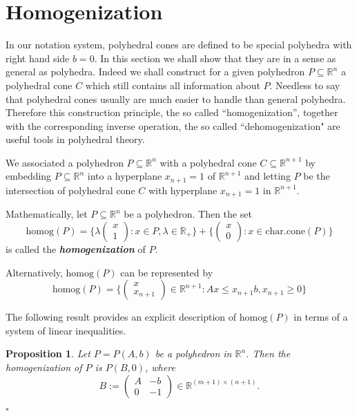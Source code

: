\documentclass{article}
\newtheorem{proposition}[theorem]{Proposition}
\newenvironment{proof}{{\it Proof.}}{ \hfill $\square$}
\def\R{{\mathbb R}}
\begin{document}
\section{Homogenization}
In our notation system,  polyhedral cones are defined to be special polyhedra with right hand side $b=0$. In this section we shall show that they are in a sense as general as polyhedra. Indeed we shall construct for a given polyhedron $P\subseteq \R^n$ a polyhedral cone $C$ which still contains all information about $P$. Needless to say that polyhedral cones usually are much easier to handle than general polyhedra. Therefore this construction principle, the so called ``homogenization'', together with the corresponding inverse operation, the so called ``dehomogenization" are useful tools in polyhedral theory.

We associated a polyhedron $P\subseteq \R^n$ with a polyhedral cone $C\subseteq\R^{n+1}$ by embedding $P\subseteq\R^n$ into a hyperplane $x_{n+1}=1$ of $\R^{n+1}$ and letting $P$ be the intersection of polyhedral cone $C$ with hyperplane $x_{n+1}=1$ in $\R^{n+1}$.

Mathematically, let $P\subseteq \R^n$ be a polyhedron. Then the set
\begin{equation}
\mbox{homog}(P)=\{\lambda\begin{pmatrix}x\\1\end{pmatrix}: x\in P, \lambda\in \R_+\}+\{\begin{pmatrix}x\\0\end{pmatrix}:x\in\mbox{char.cone}(P)\}
\end{equation}
is called the \emph{\textbf{homogenization}} of $P$.

Alternatively, $\mbox{homog}(P)$ can be represented by
\begin{equation}
\mbox{homog}(P)=\{\begin{pmatrix}x\\x_{n+1}\end{pmatrix}\in\R^{n+1}:Ax\leq x_{n+1}b,x_{n+1}\geqslant 0\}
\end{equation}

The following result provides an explicit description of $\mbox{homog}(P)$ in terms of a system of linear inequalities.

\begin{proposition}
Let $P=P(A,b)$ be a polyhedron in $\R^n$. Then the homogenization of $P$ is $P(B,0)$, where
\begin{equation}
B:=\begin{pmatrix}A & -b \\ 0 & -1\end{pmatrix}\in \R^{(m+1)\times(n+1)}.
\end{equation}
\end{proposition}
\begin{proof}
\end{proof}
\end{document}
